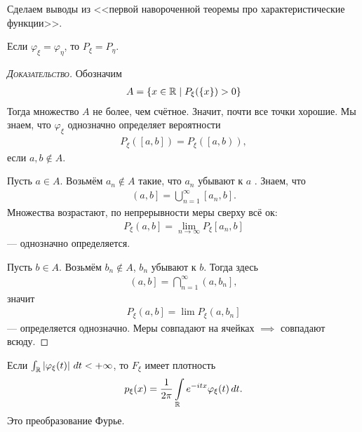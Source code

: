 \documentclass[../main.tex]{subfiles}
\begin{document}
Сделаем выводы из <<первой навороченной теоремы про характеристические функции>>.

\begin{crly}
 Если $ \varphi_\xi = \varphi_\eta $, то $ P_\xi = P_\eta $.
\end{crly}
\begin{proof}[\normalfont\textsc{Доказательство}]
 Обозначим
 \begin{align*}
 A = \left\{ x \in \mathbb{R} \;\middle|\; P_\xi(\left\{ x \right\}) > 0 \right\}
 \end{align*} Тогда множество $ A $ не более, чем счётное. Значит, почти все точки хорошие. Мы знаем, что $ \varphi_\xi $ однозначно определяет вероятности
 \begin{align*}
  P_\xi([a,b]) = P_\xi( \left[a, b\right)),
 \end{align*} если $ a,b \notin A $.

 Пусть $ a \in A $.  Возьмём  $ a_n \notin A $ такие, что  $ a_n $ убывают к  $ a $ . Знаем, что
 \begin{align*}
  \left(a, b\right]  = \bigcup_{n=1}^{\infty}[a_n,b].
 \end{align*} Множества возрастают, по непрерывности меры сверху всё ок:
 \begin{align*}
  P_\xi \left(a, b\right] = \lim_{n \to \infty} P_\xi [a_n,b] 
 \end{align*} --- однозначно определяется.

 Пусть $ b \in A $. Возьмём  $ b_n \notin A $,  $ b_n $ убывают к  $ b $. Тогда здесь
 \begin{align*}
  \left(a, b\right] = \bigcap_{n=1}^{\infty} \left(a, b_n\right] ,
 \end{align*} значит
 \begin{align*}
  P_\xi \left(a, b\right] = \lim P_\xi \left(a, b_n\right]   
 \end{align*} --- определяется однозначно. Меры совпадают на ячейках $  \implies $ совпадают всюду.
 
\end{proof}
\begin{crly}
 Если $ \int_{\mathbb{R}} \left| \varphi_\xi(t) \right|\,dt < +\infty  $, то $ F_\xi $ имеет плотность
 \begin{align*}
  p_\xi(x) = \frac{1}{2\pi} \int\limits_{\mathbb{R}} e^{-itx}\varphi_\xi(t)\,dt. 
 \end{align*} Это преобразование Фурье.
\end{crly}
\end{document}
